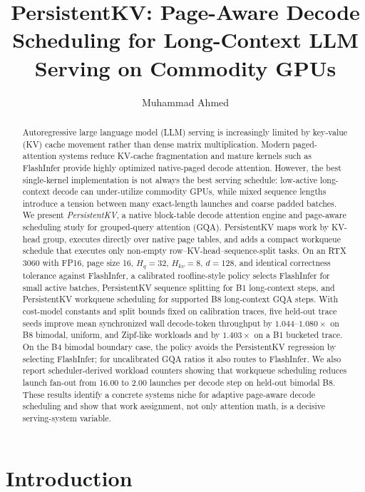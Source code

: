 \documentclass[10pt]{article}
\title{\vspace{-1.0em}\textbf{PersistentKV: Page-Aware Decode Scheduling for Long-Context LLM Serving on Commodity GPUs}}
\author{Muhammad Ahmed}
\date{}
\begin{document}
\maketitle
\vspace{-1.1em}

\begin{abstract}
Autoregressive large language model (LLM) serving is increasingly limited by
key-value (KV) cache movement rather than dense matrix multiplication. Modern
paged-attention systems reduce KV-cache fragmentation and mature kernels such
as FlashInfer provide highly optimized native-paged decode attention. However,
the best single-kernel implementation is not always the best serving schedule:
low-active long-context decode can under-utilize commodity GPUs, while mixed
sequence lengths introduce a tension between many exact-length launches and
coarse padded batches. We present \emph{PersistentKV}, a native block-table
decode attention engine and page-aware scheduling study for grouped-query
attention (GQA). PersistentKV maps work by KV-head group, executes directly
over native page tables, and adds a compact
workqueue schedule that executes only non-empty row--KV-head--sequence-split
tasks. On an RTX 3060 with FP16, page size 16, $H_q=32$, $H_{kv}=8$, $d=128$,
and identical correctness tolerance against FlashInfer, a calibrated roofline-style policy
selects FlashInfer for small active batches, PersistentKV sequence splitting
for B1 long-context steps, and PersistentKV workqueue scheduling for supported
B8 long-context GQA steps. With cost-model constants and split bounds fixed on
calibration traces, five held-out trace seeds improve mean synchronized wall decode-token
throughput by
$1.044$--$1.080\times$ on B8 bimodal, uniform, and Zipf-like workloads and by
$1.403\times$ on a B1 bucketed trace. On the B4 bimodal boundary case, the
policy avoids the PersistentKV regression by selecting FlashInfer; for
uncalibrated GQA ratios it also routes to FlashInfer. We also
report scheduler-derived workload counters showing that workqueue scheduling
reduces launch fan-out from 16.00 to 2.00 launches per decode step on held-out
bimodal B8. These results identify a concrete systems niche for adaptive
page-aware decode scheduling and show that work assignment, not only attention
math, is a decisive serving-system variable.
\end{abstract}

\section{Introduction}
\end{document}
